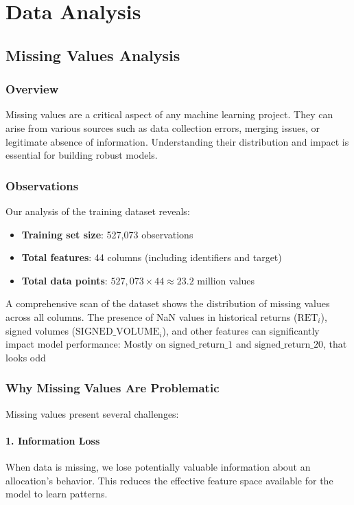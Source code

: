 \section{Data Analysis}

\subsection{Missing Values Analysis}

\subsubsection{Overview}

Missing values are a critical aspect of any machine learning project. They can arise from various sources such as data collection errors, merging issues, or legitimate absence of information. Understanding their distribution and impact is essential for building robust models.

\subsubsection{Observations}

Our analysis of the training dataset reveals:
\begin{itemize}
    \item \textbf{Training set size}: 527,073 observations
    \item \textbf{Total features}: 44 columns (including identifiers and target)
    \item \textbf{Total data points}: $527,073 \times 44 \approx 23.2$ million values
\end{itemize}

A comprehensive scan of the dataset shows the distribution of
missing values across all columns.
The presence of NaN values in historical returns ($\text{RET}_i$), signed volumes ($\text{SIGNED\_VOLUME}_i$),
and other features can significantly impact model performance: Mostly on $\text{signed\_return\_1}$ and
$\text{signed\_return\_20}$, that looks odd


\subsubsection{Why Missing Values Are Problematic}

Missing values present several challenges:

\paragraph{1. Information Loss}
When data is missing, we lose potentially valuable information about an allocation's behavior. This reduces the effective feature space available for the model to learn patterns.

